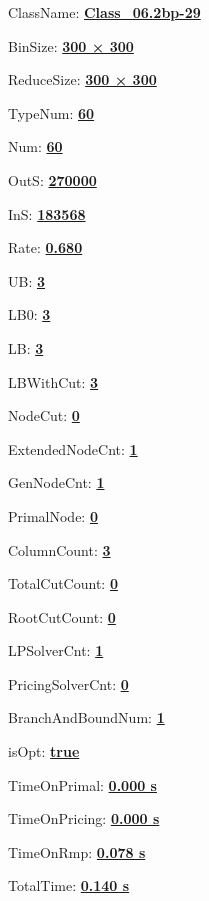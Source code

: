\documentclass[11pt]{article}
\begin{document}
\pagestyle{empty}


ClassName: \underline{\textbf{Class_06.2bp-29}}
\par
BinSize: \underline{\textbf{300 × 300}}
\par
ReduceSize: \underline{\textbf{300 × 300}}
\par
TypeNum: \underline{\textbf{60}}
\par
Num: \underline{\textbf{60}}
\par
OutS: \underline{\textbf{270000}}
\par
InS: \underline{\textbf{183568}}
\par
Rate: \underline{\textbf{0.680}}
\par
UB: \underline{\textbf{3}}
\par
LB0: \underline{\textbf{3}}
\par
LB: \underline{\textbf{3}}
\par
LBWithCut: \underline{\textbf{3}}
\par
NodeCut: \underline{\textbf{0}}
\par
ExtendedNodeCnt: \underline{\textbf{1}}
\par
GenNodeCnt: \underline{\textbf{1}}
\par
PrimalNode: \underline{\textbf{0}}
\par
ColumnCount: \underline{\textbf{3}}
\par
TotalCutCount: \underline{\textbf{0}}
\par
RootCutCount: \underline{\textbf{0}}
\par
LPSolverCnt: \underline{\textbf{1}}
\par
PricingSolverCnt: \underline{\textbf{0}}
\par
BranchAndBoundNum: \underline{\textbf{1}}
\par
isOpt: \underline{\textbf{true}}
\par
TimeOnPrimal: \underline{\textbf{0.000 s}}
\par
TimeOnPricing: \underline{\textbf{0.000 s}}
\par
TimeOnRmp: \underline{\textbf{0.078 s}}
\par
TotalTime: \underline{\textbf{0.140 s}}
\par
\newpage
\end{document}
